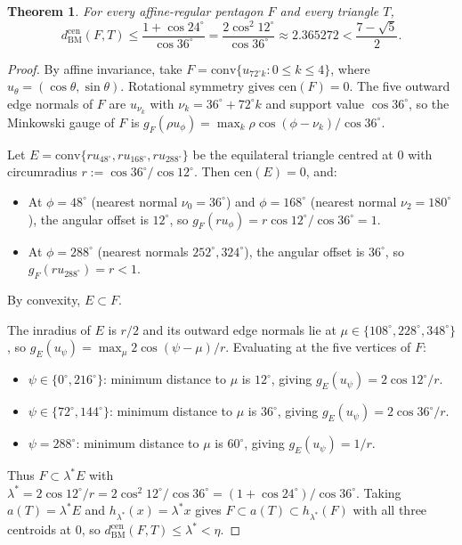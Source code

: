 \documentclass[11pt]{article}
\newtheorem{theorem}{Theorem}
\begin{document}
\begin{theorem}\label{thm:equilateral}
For every affine-regular pentagon $F$ and every triangle $T$,
\[
d_{\mathrm{BM}}^{\mathrm{cen}}(F, T)
\le \frac{1 + \cos 24^\circ}{\cos 36^\circ}
= \frac{2\cos^2 12^\circ}{\cos 36^\circ}
\approx 2.365272 < \frac{7 - \sqrt{5}}{2}.
\]
\end{theorem}

\begin{proof}
By affine invariance, take $F = \mathrm{conv}\{u_{72^\circ k} : 0 \le k \le 4\}$,
where $u_\theta = (\cos\theta, \sin\theta)$. Rotational symmetry gives
$\mathrm{cen}(F) = 0$. The five outward edge normals of $F$ are $u_{\nu_k}$
with $\nu_k = 36^\circ + 72^\circ k$ and support value $\cos 36^\circ$, so the
Minkowski gauge of $F$ is
$g_F(\rho u_\phi) = \max_k \rho \cos(\phi - \nu_k) / \cos 36^\circ$.

Let $E = \mathrm{conv}\{r u_{48^\circ}, r u_{168^\circ}, r u_{288^\circ}\}$ be
the equilateral triangle centred at $0$ with circumradius
$r := \cos 36^\circ / \cos 12^\circ$. Then $\mathrm{cen}(E) = 0$, and:
\begin{itemize}
  \item At $\phi = 48^\circ$ (nearest normal $\nu_0 = 36^\circ$) and
        $\phi = 168^\circ$ (nearest normal $\nu_2 = 180^\circ$), the angular
        offset is $12^\circ$, so $g_F(r u_\phi) = r\cos 12^\circ / \cos 36^\circ = 1$.
  \item At $\phi = 288^\circ$ (nearest normals $252^\circ, 324^\circ$), the
        angular offset is $36^\circ$, so $g_F(r u_{288^\circ}) = r < 1$.
\end{itemize}
By convexity, $E \subset F$.

The inradius of $E$ is $r/2$ and its outward edge normals lie at
$\mu \in \{108^\circ, 228^\circ, 348^\circ\}$, so
$g_E(u_\psi) = \max_\mu 2\cos(\psi - \mu) / r$. Evaluating at the five
vertices of $F$:
\begin{itemize}
  \item $\psi \in \{0^\circ, 216^\circ\}$: minimum distance to $\mu$ is
        $12^\circ$, giving $g_E(u_\psi) = 2\cos 12^\circ / r$.
  \item $\psi \in \{72^\circ, 144^\circ\}$: minimum distance to $\mu$ is
        $36^\circ$, giving $g_E(u_\psi) = 2\cos 36^\circ / r$.
  \item $\psi = 288^\circ$: minimum distance to $\mu$ is $60^\circ$, giving
        $g_E(u_\psi) = 1 / r$.
\end{itemize}
Thus $F \subset \lambda^* E$ with
$\lambda^* = 2\cos 12^\circ / r = 2\cos^2 12^\circ / \cos 36^\circ
= (1 + \cos 24^\circ)/\cos 36^\circ$. Taking $a(T) = \lambda^* E$ and
$h_{\lambda^*}(x) = \lambda^* x$ gives $F \subset a(T) \subset h_{\lambda^*}(F)$
with all three centroids at $0$, so
$d_{\mathrm{BM}}^{\mathrm{cen}}(F, T) \le \lambda^* < \eta$.
\end{proof}
\end{document}
